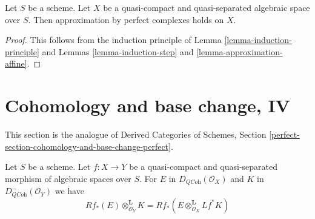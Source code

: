 \begin{theorem}
\label{theorem-approximation}
Let $S$ be a scheme.
Let $X$ be a quasi-compact and quasi-separated algebraic space over $S$.
Then approximation by perfect complexes holds on $X$.
\end{theorem}

\begin{proof}
This follows from the induction principle of
Lemma \ref{lemma-induction-principle}
and Lemmas \ref{lemma-induction-step} and \ref{lemma-approximation-affine}.
\end{proof}







\section{Cohomology and base change, IV}
\label{section-cohomology-and-base-change-perfect}

\noindent
This section is the analogue of Derived Categories of Schemes, Section
\ref{perfect-section-cohomology-and-base-change-perfect}.

\begin{lemma}
\label{lemma-cohomology-base-change}
Let $S$ be a scheme. Let $f : X \to Y$ be a quasi-compact and quasi-separated
morphism of algebraic spaces over $S$. For $E$ in
$D_{\textit{QCoh}}(\mathcal{O}_X)$ and
$K$ in $D^-_{\textit{QCoh}}(\mathcal{O}_Y)$ we have
$$
Rf_*(E) \otimes_{\mathcal{O}_Y}^\mathbf{L} K =
Rf_*(E \otimes_{\mathcal{O}_X}^\mathbf{L} Lf^*K)
$$
\end{lemma}

